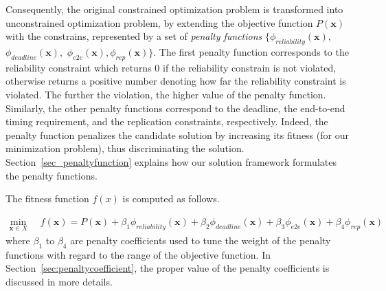Consequently, the original constrained optimization problem is transformed into unconstrained optimization problem, by extending the objective function $P(\textbf{x})$ with the constrains, represented by a set of \textit{penalty functions} $\{\phi_{reliability}(\textbf{x}),$  $\phi_{deadline}(\textbf{x}),$ $\phi_{e2e}(\textbf{x}), \phi_{rep}(\textbf{x})\}$. The first penalty function corresponds to the reliability constraint which returns 0 if the reliability constrain is not violated, otherwise returns a positive number denoting how far the reliability constraint is violated. The further the violation, the higher value of the penalty function. Similarly, the other penalty functions correspond to the deadline, the end-to-end timing requirement, and the replication constraints, respectively. 
Indeed, the penalty function penalizes the candidate solution by increasing its fitness (for our minimization problem), thus discriminating the solution. Section~\ref{sec_penaltyfunction} explains how our solution framework formulates the penalty functions.

The fitness function $f(x)$ is computed as follows.


\begin{align}
\label{eqn_penalityfunc}
\min_{\textbf{x}\in X}\;\;& f(\textbf{x})=P(\textbf{x}) + \beta_1 \phi_{reliability}(\textbf{x}) + \beta_2 \phi_{deadline}(\textbf{x}) + \beta_3 \phi_{e2e}(\textbf{x}) + \beta_4 \phi_{rep}(\textbf{x}) 
\end{align}
where $\beta_1$ to $\beta_4$ are penalty coefficients used to tune the weight of the penalty functions with regard to the range of the objective function. In Section~\ref{sec:penaltycoefficient}, the proper value of the penalty coefficients is discussed in more details.

